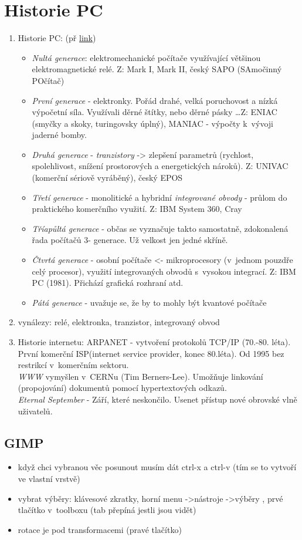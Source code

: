 \documentclass[12pt]{article}
\begin{document}
\section{Historie PC}
\begin{enumerate}
\item Historie PC: (př \href{https://historiepocitacu.cz/obecny-prehled-generaci-pocitacu.html}{link})
\begin{itemize}
\item \emph{Nultá generace}: elektromechanické počítače využívající většinou elektromagnetické relé. Z: Mark I, Mark II, český SAPO (SAmočinný POčítač)
\item \emph{První generace} - elektronky. Pořád drahé, velká poruchovost a nízká výpočetní síla. Využívali děrné štítky, nebo děrné pásky \dots Z: ENIAC (smyčky a skoky, turingovsky úplný), MANIAC - výpočty k~vývoji jaderné bomby.
\item \emph{Druhá generace} -  \emph{tranzistory} -> zlepšení parametrů (rychlost, spolehlivost, snížení prostorových a energetických nároků). Z: UNIVAC (komerční sériově vyráběný), český EPOS
\item  \emph{Třetí generace} - monolitické a hybridní \emph{integrované obvody} - průlom do praktického komerčního využití. Z: IBM System 360, Cray
\item \emph{Tříapůltá generace} - občas se vyznačuje takto samostatně, zdokonalená řada počítačů 3- generace. Už velkost jen jedné skříně.
\item \emph{Čtvrtá generace} - osobní počítače <- mikroprocesory (v~jednom pouzdře celý procesor), využití integrovaných obvodů s~vysokou integrací. Z: IBM PC (1981). Přichází grafická rozhraní atd.
\item \emph{Pátá generace} - uvažuje se, že by to mohly být kvantové počítače
\end{itemize}
\item vynálezy: relé, elektronka, tranzistor, integrovaný obvod
\item Historie internetu: ARPANET - vytvoření protokolů TCP/IP (70.-80. léta). První komerční ISP(internet service provider, konec 80.léta). Od 1995 bez restrikcí v~komerčním sektoru.\\
\emph{WWW} vymyšlen v~CERNu (Tim Berners-Lee). Umožňuje linkování (propojování) dokumentů pomocí hypertextových odkazů.\\
\emph{Eternal September} - Září, které neskončilo. Usenet přístup nové obrovské vlně uživatelů. 
\end{enumerate}
\subsection{GIMP}
\begin{itemize}
\item když chci vybranou věc posunout musím dát ctrl-x a ctrl-v (tím se to vytvoří ve vlastní vrstvě)
\item vybrat výběry: klávesové zkratky, horní menu ->nástroje ->výběry , prvé tlačítko v~toolboxu (tab přepíná jestli jsou vidět)
\item rotace je pod transformacemi (pravé tlačítko)
\end{itemize}
\end{document}
